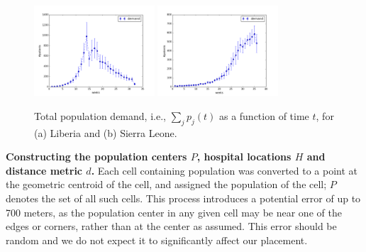 \begin{figure}
\centering %
\includegraphics[width=0.4\textwidth]{figs/plot_demand.png}
\includegraphics[width=0.4\textwidth]{figs/plot_demand_SL.png}
\caption{Total population demand, i.e., $\sum_j p_j(t)$ as a function of time $t$, for
(a) Liberia and (b) Sierra Leone.}
\label{fig:demand-dist}
\end{figure}

\noindent
\textbf{Constructing the population centers $P$, hospital locations $H$ and distance metric $d$.}
Each cell containing population was converted to a point at the geometric centroid of the cell, 
and assigned the population of the cell; $P$ denotes the set of all such cells.
This process introduces a potential error of up to 700 meters, as the 
population center in any given cell may be near one of the edges or corners, rather than at the 
center as assumed. This error should be random and we do not expect it to significantly affect our placement. 

